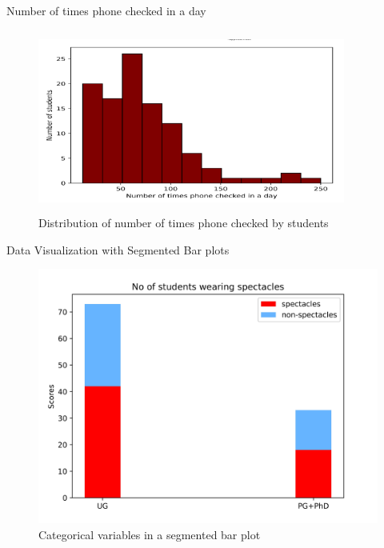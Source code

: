 \documentclass{beamer}
\begin{document}
\begin{frame}
\begin{block}{Number of times phone checked in a day}
\begin{figure}[hbtp]
\caption{Distribution of number of times phone checked by students}
\centering
\includegraphics[width = 0.9\textwidth, height=6cm]{phone_check.png}
\end{figure}
\end{block}
\end{frame}

\begin{frame}
\begin{block}{Data Visualization with Segmented Bar plots}
\begin{figure}[hbtp]
\caption{Categorical variables in a segmented bar plot}
\centering
\includegraphics[scale=0.5]{no_of_students having_specs.jpg}
\end{figure}
\end{block}
\end{frame}
\end{document}

